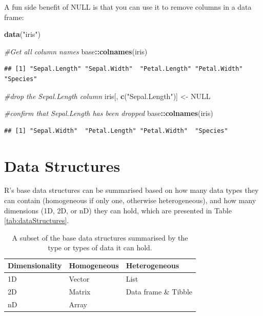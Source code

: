 \documentclass[
]{book}
\newenvironment{Shaded}{\begin{snugshade}}{\end{snugshade}}
\newcommand{\CommentTok}[1]{\textcolor[rgb]{0.56,0.35,0.01}{\textit{#1}}}
\newcommand{\ConstantTok}[1]{\textcolor[rgb]{0.56,0.35,0.01}{#1}}
\newcommand{\FunctionTok}[1]{\textcolor[rgb]{0.13,0.29,0.53}{\textbf{#1}}}
\newcommand{\NormalTok}[1]{#1}
\newcommand{\OtherTok}[1]{\textcolor[rgb]{0.56,0.35,0.01}{#1}}
\newcommand{\SpecialCharTok}[1]{\textcolor[rgb]{0.81,0.36,0.00}{\textbf{#1}}}
\newcommand{\StringTok}[1]{\textcolor[rgb]{0.31,0.60,0.02}{#1}}
\begin{document}
A fun side benefit of NULL is that you can use it to remove columns in a data frame:

\begin{Shaded}
\begin{Highlighting}[]
\FunctionTok{data}\NormalTok{(}\StringTok{"iris"}\NormalTok{)}

\CommentTok{\#Get all column names}
\NormalTok{base}\SpecialCharTok{::}\FunctionTok{colnames}\NormalTok{(iris)}
\end{Highlighting}
\end{Shaded}

\begin{verbatim}
## [1] "Sepal.Length" "Sepal.Width"  "Petal.Length" "Petal.Width"  "Species"
\end{verbatim}

\begin{Shaded}
\begin{Highlighting}[]
\CommentTok{\#drop the Sepal.Length column }
\NormalTok{iris[, }\FunctionTok{c}\NormalTok{(}\StringTok{"Sepal.Length"}\NormalTok{)] }\OtherTok{\textless{}{-}} \ConstantTok{NULL}

\CommentTok{\#confirm that Sepal.Length has been dropped}
\NormalTok{base}\SpecialCharTok{::}\FunctionTok{colnames}\NormalTok{(iris)}
\end{Highlighting}
\end{Shaded}

\begin{verbatim}
## [1] "Sepal.Width"  "Petal.Length" "Petal.Width"  "Species"
\end{verbatim}

\section{Data Structures}\label{sec:dataStructure}

R's base data structures can be summarised based on how many data types they can contain (homogeneous if only one, otherwise heterogeneous), and how many dimensions (1D, 2D, or nD) they can hold, which are presented in Table \ref{tab:dataStructures}.

\begin{table}

\caption{\label{tab:data-structures}A subset of the base data structures summarised by the type or types of data it can hold.}
\centering
\begin{tabular}[t]{l|l|l}
\hline
Dimensionality & Homogeneous & Heterogeneous\\
\hline
1D & Vector & List\\
\hline
2D & Matrix & Data frame \& Tibble\\
\hline
nD & Array & \\
\hline
\end{tabular}
\end{table}
\end{document}
